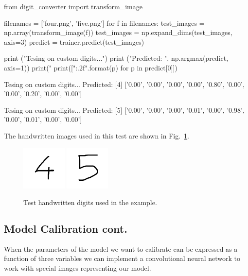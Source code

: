\begin{ipython}
from digit_converter import transform_image

filenames = ['four.png', 'five.png']
for f in filenames:
    test_images = np.array(transform_image(f))
test_images = np.expand_dims(test_images, axis=3)
predict = trainer.predict(test_images)

print ("Tesing on custom digits...")
print ("Predicted: ", np.argmax(predict, axis=1))
print("%
print(["{:.2f}".format(p) for p in predict[0]])
\end{ipython}
\begin{ioutput}
Tesing on custom digits...
Predicted:  [4]
['0.00', '0.00', '0.00', '0.00', '0.80', '0.00', '0.00', '0.20', '0.00', '0.00']

Tesing on custom digits...
Predicted:  [5]
['0.00', '0.00', '0.00', '0.01', '0.00', '0.98', '0.00', '0.01', '0.00', '0.00']
\end{ioutput}
The handwritten images used in this test are shown in Fig.~\ref{fig:test_images}.

\begin{figure}[htb]
	\centering
	\includegraphics[width=0.2\textwidth]{figures/four.png}
	\includegraphics[width=0.2\textwidth]{figures/five.png}
	\caption{Test handwritten digits used in the example.}
	\label{fig:test_images}
\end{figure}

\subsection{Model Calibration cont.}
\label{model-calibration-cont.}

When the parameters of the model we want to calibrate can be expressed as a function of three variables we can implement a convolutional neural network to work with special images representing our model.


